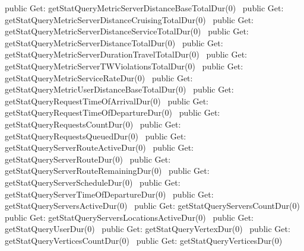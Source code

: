 public \LA{}Get: getStatQueryMetricServerDistanceBaseTotalDur(0)~{\nwtagstyle{}}\RA{}
public \LA{}Get: getStatQueryMetricServerDistanceCruisingTotalDur(0)~{\nwtagstyle{}}\RA{}
public \LA{}Get: getStatQueryMetricServerDistanceServiceTotalDur(0)~{\nwtagstyle{}}\RA{}
public \LA{}Get: getStatQueryMetricServerDistanceTotalDur(0)~{\nwtagstyle{}}\RA{}
public \LA{}Get: getStatQueryMetricServerDurationTravelTotalDur(0)~{\nwtagstyle{}}\RA{}
public \LA{}Get: getStatQueryMetricServerTWViolationsTotalDur(0)~{\nwtagstyle{}}\RA{}
public \LA{}Get: getStatQueryMetricServiceRateDur(0)~{\nwtagstyle{}}\RA{}
public \LA{}Get: getStatQueryMetricUserDistanceBaseTotalDur(0)~{\nwtagstyle{}}\RA{}
public \LA{}Get: getStatQueryRequestTimeOfArrivalDur(0)~{\nwtagstyle{}}\RA{}
public \LA{}Get: getStatQueryRequestTimeOfDepartureDur(0)~{\nwtagstyle{}}\RA{}
public \LA{}Get: getStatQueryRequestsCountDur(0)~{\nwtagstyle{}}\RA{}
public \LA{}Get: getStatQueryRequestsQueuedDur(0)~{\nwtagstyle{}}\RA{}
public \LA{}Get: getStatQueryServerRouteActiveDur(0)~{\nwtagstyle{}}\RA{}
public \LA{}Get: getStatQueryServerRouteDur(0)~{\nwtagstyle{}}\RA{}
public \LA{}Get: getStatQueryServerRouteRemainingDur(0)~{\nwtagstyle{}}\RA{}
public \LA{}Get: getStatQueryServerScheduleDur(0)~{\nwtagstyle{}}\RA{}
public \LA{}Get: getStatQueryServerTimeOfDepartureDur(0)~{\nwtagstyle{}}\RA{}
public \LA{}Get: getStatQueryServersActiveDur(0)~{\nwtagstyle{}}\RA{}
public \LA{}Get: getStatQueryServersCountDur(0)~{\nwtagstyle{}}\RA{}
public \LA{}Get: getStatQueryServersLocationsActiveDur(0)~{\nwtagstyle{}}\RA{}
public \LA{}Get: getStatQueryUserDur(0)~{\nwtagstyle{}}\RA{}
public \LA{}Get: getStatQueryVertexDur(0)~{\nwtagstyle{}}\RA{}
public \LA{}Get: getStatQueryVerticesCountDur(0)~{\nwtagstyle{}}\RA{}
public \LA{}Get: getStatQueryVerticesDur(0)~{\nwtagstyle{}}\RA{}
\nwendcode{}\nwdocspar

